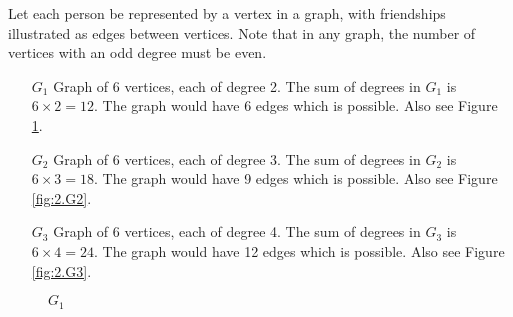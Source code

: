 \documentclass[11pt, letterpaper, includehead]{article}
\theoremstyle{plain}
\theoremstyle{mydefinition}
\theoremstyle{myproperty}
\begin{document}
\begin{enumerate}[label=\textbf{\arabic*}., leftmargin=*]
          Let each person be represented by a vertex in a graph, with friendships illustrated as edges between vertices. Note that in any graph, the number of vertices with an odd degree must be even.

          \begin{enumerate}
              \item[$G_1$] Graph of 6 vertices, each of degree 2. The sum of
                  degrees in $G_1$ is $6 \times 2 = 12$. The graph would have 6
                  edges which is
                  possible. Also see Figure \ref{fig:2.G1}.
              \item[$G_2$] Graph of 6 vertices, each of degree 3. The sum of
                  degrees in $G_2$ is $6 \times 3 = 18$. The graph would have 9
                  edges which is
                  possible. Also see Figure \ref{fig:2.G2}.
              \item[$G_3$] Graph of 6 vertices, each of degree 4. The sum of
                  degrees in $G_3$ is $6 \times 4 = 24$. The graph would have
                  12 edges which is
                  possible. Also see Figure \ref{fig:2.G3}.
          \end{enumerate}

          \begin{multicols}{3}

              \begin{figure}[H]
                  \centering
                  \caption{$G_1$}
                  \label{fig:2.G1}
              \end{figure}

              \columnbreak

              \begin{figure}[H]
                  \centering
\end{figure}
\end{multicols}
\end{enumerate}
\end{document}

